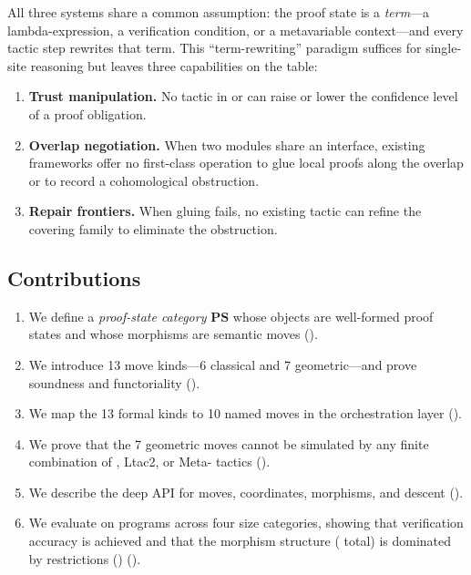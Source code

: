 \documentclass[11pt]{article}
\newcommand{\PScat}{\mathbf{PS}}
\begin{document}
All three systems share a common assumption: the proof state is a
\emph{term}---a lambda-expression, a verification condition, or a
metavariable context---and every tactic step rewrites that term.
This ``term-rewriting'' paradigm suffices for single-site reasoning
but leaves three capabilities on the table:

\begin{enumerate}[label=(\alph*),nosep]
  \item \textbf{Trust manipulation.}
        No tactic in \LEAN{} or \Coq{} can raise or lower the
        confidence level of a proof obligation.
  \item \textbf{Overlap negotiation.}
        When two modules share an interface, existing frameworks
        offer no first-class operation to glue local proofs along
        the overlap or to record a cohomological obstruction.
  \item \textbf{Repair frontiers.}
        When gluing fails, no existing tactic can refine the
        covering family to eliminate the obstruction.
\end{enumerate}

\subsection{Contributions}

\begin{enumerate}[leftmargin=*]
\item We define a \emph{proof-state category} $\PScat$ whose
      objects are well-formed proof states and whose morphisms
      are semantic moves ().
\item We introduce 13 move kinds---6 classical and 7 geometric---and
      prove soundness and functoriality
      ().
\item We map the 13 formal kinds to 10 named moves in the
      \JuGeo{} orchestration layer ().
\item We prove that the 7 geometric moves cannot be simulated
      by any finite combination of \LEAN, Ltac2, or Meta-\Fstar{}
      tactics ().
\item We describe the deep \JuGeo{} API for moves, coordinates,
      morphisms, and descent ().
\item We evaluate on \compTotalPrograms{} programs across four size categories,
      showing that \compOverallAccuracy{} verification accuracy is achieved
      and that the morphism structure (\compMorphTotal{} total)
      is dominated by restrictions (\compMorphRestrictionPct)
      ().
\end{enumerate}
\end{document}
